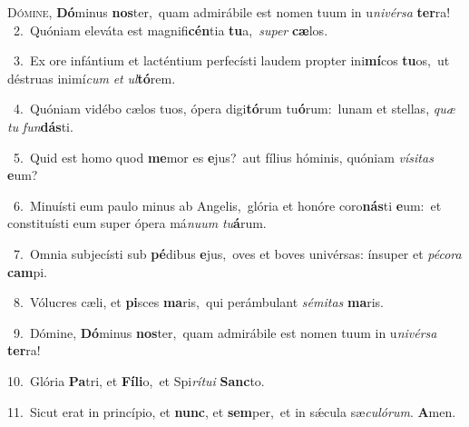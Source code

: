 \lettrine{\initial\textcolor{\initialcolor}{D}}{ómine,} \textbf{Dó}\-minus \textbf{nos}\-ter,~\star quam admirábile est nomen tuum in u\-\textit{ni}\-\textit{vér}\textit{sa} \textbf{ter}\-ra!\\
{\numbfont\textcolor{\numbcolor}{~2.}}~Quóniam eleváta est magnifi\-\textbf{cén}\-tia \textbf{tu}\-a,~\star \textit{su}\-\textit{per} \textbf{cæ}\-los.\par
{\numbfont\textcolor{\numbcolor}{~3.}}~Ex ore infántium et lacténtium perfecísti laudem propter ini\-\textbf{mí}\-cos \textbf{tu}\-os,~\star ut déstruas inimí\textit{cum} \textit{et} \textit{ul}\-\textbf{tó}rem.\par
{\numbfont\textcolor{\numbcolor}{~4.}}~Quóniam vidébo cælos tuos, ópera digi\-\textbf{tó}\-rum tu\-\textbf{ó}\-rum:~\star lunam et stellas, \textit{quæ} \textit{tu} \textit{fun}\-\textbf{dás}ti.\par
{\numbfont\textcolor{\numbcolor}{~5.}}~Quid est homo quod \textbf{me}\-mor es \textbf{e}\-jus?~\star aut fílius hóminis, quóniam \textit{ví}\-\textit{si}\textit{tas} \textbf{e}\-um?\par
{\numbfont\textcolor{\numbcolor}{~6.}}~Minuísti eum paulo minus ab Angelis,~\dagger glória et honóre coro\-\textbf{nás}\-ti \textbf{e}\-um:~\star et constituísti eum super ópera má\-\textit{nu}\-\textit{um} \textit{tu}\-\textbf{á}rum.\par
{\numbfont\textcolor{\numbcolor}{~7.}}~Omnia subjecísti sub \textbf{pé}\-dibus \textbf{e}\-jus,~\star oves et boves univérsas: ínsuper et \textit{pé}\-\textit{co}\textit{ra} \textbf{cam}\-pi.\par
{\numbfont\textcolor{\numbcolor}{~8.}}~Vólucres cæli, et \textbf{pi}\-sces \textbf{ma}\-ris,~\star qui perámbulant \textit{sé}\-\textit{mi}\textit{tas} \textbf{ma}\-ris.\par
{\numbfont\textcolor{\numbcolor}{~9.}}~Dómine, \textbf{Dó}\-minus \textbf{nos}\-ter,~\star quam admirábile est nomen tuum in u\-\textit{ni}\-\textit{vér}\textit{sa} \textbf{ter}\-ra!\par
{\numbfont\textcolor{\numbcolor}{10.}}~Glória \textbf{Pa}\-tri, et \textbf{Fí}\-\textbf{li}o,~\star et Spi\-\textit{rí}\-\textit{tu}\textit{i} \textbf{Sanc}\-to.\par
{\numbfont\textcolor{\numbcolor}{11.}}~Sicut erat in princípio, et \textbf{nunc}\-, et \textbf{sem}\-per,~\star et in sǽcula sæ\-\textit{cu}\-\textit{ló}\textit{rum}. \textbf{A}\-men.\par
